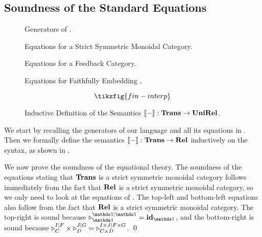 \subsection{Soundness of the Standard Equations}\label{app:fin-soundness}

\begin{figure*}[h]
	\caption{Generators of .}
	\label{appfig:graph-generators}
\end{figure*}

\begin{figure*}[h]
	\caption{Equations for a Strict Symmetric Monoidal Category.}
	\label{appfig:rel-equations-fin}
\end{figure*}


\begin{figure*}[h]
	\caption{Equations for a Feedback Category.}
	\label{appfig:graph-feedback}
\end{figure*}

\begin{figure*}[h]
	\caption{Equations for Faithfully Embedding .}
	\label{appfig:graph-finrel}
\end{figure*}

\begin{figure*}
	\[\tikzfig{fin-interp}\]
	\caption{Inductive Definition of the Semantics $\binterp{-} : \bfup{Trans} \to \bfup{UniRel}$.}
	\label{appfig:fin-interp}
\end{figure*}

We start by  recalling the generators of our language and all its equations in . Then we formally define the semantics $\binterp{-} : \bfup{Trans} \to \bfup{Rel}$ inductively on the syntax, as shown in .

We now prove the soundness of the equational theory. The soundness of the equations stating that $\textbf{\textup{Trans}}$ is a strict symmetric monoidal category follows immediately from the fact that $\textbf{\textup{Rel}}$ is a strict symmetric monoidal category, so we only need to look at the equations of . The top-left and bottom-left equations also follow from the fact that $\textbf{\textup{Rel}}$ is a strict symmetric monoidal category. The top-right is sound because $\shift{\one}{\one}_\one = \id_\one$, and the bottom-right is sound because $\shift{I}{F}_C \times \shift{J}{G}_D = \shift{I \times J}{F \times G}_{C \times D}$. \qed

